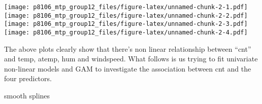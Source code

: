 \documentclass[]{article}
\newenvironment{Shaded}{\begin{snugshade}}{\end{snugshade}}
\newcommand{\KeywordTok}[1]{\textcolor[rgb]{0.13,0.29,0.53}{\textbf{#1}}}
\newcommand{\DataTypeTok}[1]{\textcolor[rgb]{0.13,0.29,0.53}{#1}}
\newcommand{\DecValTok}[1]{\textcolor[rgb]{0.00,0.00,0.81}{#1}}
\newcommand{\StringTok}[1]{\textcolor[rgb]{0.31,0.60,0.02}{#1}}
\newcommand{\CommentTok}[1]{\textcolor[rgb]{0.56,0.35,0.01}{\textit{#1}}}
\newcommand{\OperatorTok}[1]{\textcolor[rgb]{0.81,0.36,0.00}{\textbf{#1}}}
\newcommand{\NormalTok}[1]{#1}
\begin{document}
\begin{Shaded}
\end{Shaded}

\texttt{[image: p8106\_mtp\_group12\_files/figure-latex/unnamed-chunk-2-1.pdf]}
\texttt{[image: p8106\_mtp\_group12\_files/figure-latex/unnamed-chunk-2-2.pdf]}
\texttt{[image: p8106\_mtp\_group12\_files/figure-latex/unnamed-chunk-2-3.pdf]}
\texttt{[image: p8106\_mtp\_group12\_files/figure-latex/unnamed-chunk-2-4.pdf]}

The above plots clearly show that there's non linear relationship
between ``cnt'' and temp, atemp, hum and windspeed. What follows is us
trying to fit univariate non-linear models and GAM to investigate the
association between cnt and the four predictors.

smooth splines

\begin{Shaded}
\end{Shaded}
\end{document}
